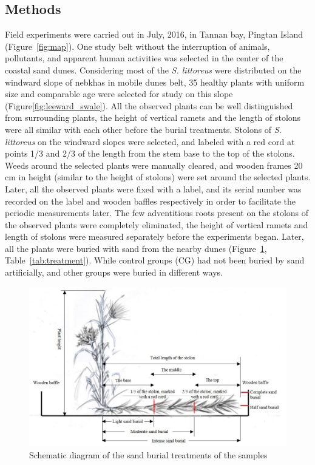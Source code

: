\documentclass[]{interact}
\theoremstyle{plain}%
\theoremstyle{definition}
\theoremstyle{remark}
\begin{document}
\subsection{Methods}
Field experiments were carried out in July, 2016, in Tannan bay, Pingtan Island (Figure~\ref{fig:map}). One study belt without the interruption of animals, pollutants, and apparent human activities was selected in the center of the coastal sand dunes. 
Considering most of the \textit{S. littoreus} were distributed on the windward slope of nebkhas in mobile dunes belt, 35 healthy plants with uniform size and comparable age were selected for study on this slope (Figure\ref{fig:leeward_swale}). All the observed plants can be well distinguished from surrounding plants, the height of vertical ramets and the length of stolons were all similar with each other before the burial treatments. Stolons of \textit{S. littoreus} on the windward slopes were selected, and labeled with a red cord at points 1/3 and 2/3 of the length from the stem base to the top of the stolons. Weeds around the selected plants were manually cleared, and wooden frames 20 cm in height (similar to the height of stolons) were set around the selected plants. Later, all the observed plants were fixed with a label, and its serial number was recorded on the label and wooden baffles respectively in order to facilitate the periodic measurements later. The few adventitious roots present on the stolons of the observed plants were completely eliminated, the height of vertical ramets and length of stolons were measured separately before the experiments began. Later, all the plants were buried with sand from the nearby dunes (Figure~\ref{fig:diagram}, Table~\ref{tab:treatment}). While control groups (CG) had not been buried by sand artificially, and other groups were buried in different ways. 


\begin{figure}
  \centering
  \includegraphics[scale=0.5]{../figs/diagram.jpg}
  \caption{Schematic diagram of the sand burial treatments of the samples} 
  \label{fig:diagram}
\end{figure}
\end{document}

